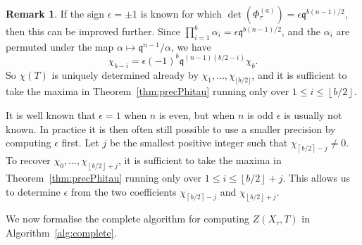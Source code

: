 \documentclass[a4paper,11pt]{article}
\numberwithin{equation}{section}
\providecommand{\floor}[1]{\left\lfloor#1\right\rfloor}   %
\providecommand{\ceil}[1]{\left\lceil#1\right\rceil}   %
\theoremstyle{definition}
\newtheorem{rem}[thm]{Remark}
\begin{document}
\begin{rem} \label{rem:epsilon}
If the sign $\epsilon = \pm 1$ is known for which 
$\det(\Phi_{\tau}^{(a)}) = \epsilon \mathfrak{q}^{b(n-1)/2}$, then this can 
be improved further. Since 
$\prod_{i=1}^b \alpha_i = \epsilon \mathfrak{q}^{b(n-1)/2}$, and 
the $\alpha_i$ are permuted under the map 
$\alpha \mapsto \mathfrak{q}^{n-1}/\alpha$, we have
\begin{equation*}
\chi_{b-i}=\epsilon (-1)^{b} \mathfrak{q}^{(n-1)(b/2-i)} \chi_b. 
\end{equation*}
So $\chi(T)$ is uniquely determined already by 
$\chi_1,\dotsc,\chi_{\lfloor b/2 \rfloor}$, and it is sufficient 
to take the maxima in Theorem~\ref{thm:precPhitau} running only over 
$1 \leq i \leq \floor{b/2}$.

It is well known that $\epsilon = 1$ when $n$ is even, but when $n$ 
is odd $\epsilon$ is usually not known. In practice it is then often 
still possible to use a smaller precision by computing $\epsilon$ first. 
Let $j$ be the smallest positive integer such that $\chi_{\ceil{b/2} - j} \neq 0$. 
To recover $\chi_0, \dotsc, \chi_{\floor{b/2}+j}$, it is sufficient to take 
the maxima in Theorem~\ref{thm:precPhitau} running only over 
$1 \leq i \leq \floor{b/2}+j$. This allows us to determine $\epsilon$ from 
the two coefficients $\chi_{\ceil{b/2}-j}$ and $\chi_{\floor{b/2}+j}$. 
\end{rem}

We now formalise the complete algorithm for computing $Z(X_{\tau},T)$ 
in Algorithm~\ref{alg:complete}.
\end{document}
